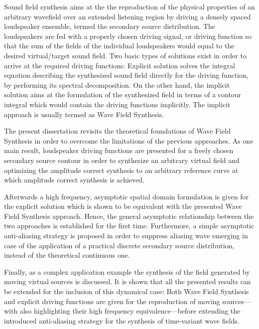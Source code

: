 Sound field synthesis aims at the the reproduction of the physical properties of an arbitrary wavefield over an extended listening region by driving a densely spaced loudspeaker ensemble, termed the secondary source distribution.
The loudspeakers are fed with a properly chosen driving signal, or driving function so that the sum of the fields of the individual loudspeakers would equal to the desired virtual/target sound field.
Two basic types of solutions exist in order to arrive at the required driving functions:
Explicit solution solves the integral equation describing the synthesized sound field directly for the driving function, by performing its spectral decomposition.
On the other hand, the implicit solution aims at the formulation of the synthesized field in terms of a contour integral which would contain the driving functions implicitly.
The implicit approach is usually termed as Wave Field Synthesis.

The present dissertation revisits the theoretical foundations of Wave Field Synthesis in order to overcome the limitations of the previous approaches.
As one main result, loudspeaker driving functions are presented for a freely chosen secondary source contour in order to synthesize an arbitrary virtual field and optimizing the amplitude correct synthesis to an arbitrary reference curve at which amplitude correct synthesis is achieved.

Afterwards a high frequency, asymptotic spatial domain formulation is given for the explicit solution which is shown to be equivalent with the presented Wave Field Synthesis approach.
Hence, the general asymptotic relationship between the two approaches is established for the first time.
Furthermore, a simple asymptotic anti-aliasing strategy is proposed in order to suppress aliasing wave emerging in case of the application of a practical discrete secondary source distribution, instead of the theoretical continuous one.

Finally, as a complex application example the synthesis of the field generated by moving virtual sources is discussed.
It is shown that all the presented results can be extended for the inclusion of this dynamical case: 
Both Wave Field Synthesis and explicit driving functions are given for the reproduction of moving sources---with also highlighting their high frequency equivalence---before extending the introduced anti-aliasing strategy for the synthesis of time-variant wave fields.